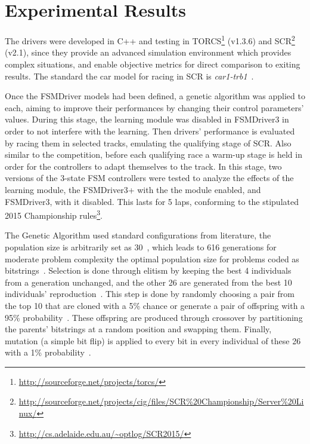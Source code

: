 \section{Experimental Results}\label{sec:4}%
\newcommand{\car}[1]{\emph{#1}}%

The drivers were developed in C++ and testing in TORCS\footnote{\url{http://sourceforge.net/projects/torcs/}} (v1.3.6) and SCR\footnote{\url{http://sourceforge.net/projects/cig/files/SCR\%20Championship/Server\%20Linux/}} (v2.1), since they provide an advanced simulation environment which provides complex situations, and enable objective metrics for direct comparison to exiting results. The standard the car model for racing in SCR is \car{car1-trb1}~\cite{SCR}.


Once the FSMDriver models had been defined, a genetic algorithm was applied to each, aiming to improve their performances by changing their control parameters' values. During this stage, the learning module was disabled in FSMDriver3 in order to not interfere with the learning. Then drivers' performance is evaluated by racing them in selected tracks, emulating the qualifying stage of SCR. Also similar to the competition, before each qualifying race a warm-up stage is held in order for the controllers to adapt themselves to the track. In this stage, two versions of the 3-state FSM controllers were tested to analyze the effects of the learning module, the FSMDriver3+ with the the module enabled, and FSMDriver3, with it disabled. This lasts for 5 laps, conforming to the stipulated 2015 Championship rules\footnote{\url{http://cs.adelaide.edu.au/~optlog/SCR2015/}}.

The Genetic Algorithm used standard configurations from literature, the population size is arbitrarily set as 30~\cite{RATES}, which leads to 616 generations for moderate problem complexity the optimal population size for problems coded as bitstrings~\cite{218485}. Selection is done through elitism by keeping the best 4 individuals from a generation unchanged, and the other 26 are generated from the best 10 individuals' reproduction~\cite{ELITISM}. This step is done by randomly choosing a pair from the top 10 that are cloned with a 5\% chance or generate a pair of offspring with a 95\% probability~\cite{RATES}. These offspring are produced through crossover by partitioning the parents' bitstrings at a random position and swapping them. Finally, mutation (a simple bit flip) is applied to every bit in every individual of these 26 with a 1\% probability~\cite{RATES}.

